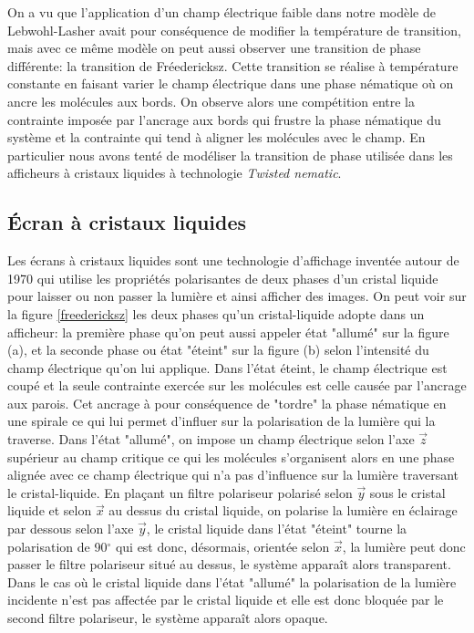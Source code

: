 \documentclass[11pt,a4paper]{article}
\numberwithin{equation}{section}
\begin{document}



On a vu que l'application d'un champ électrique faible dans notre modèle de Lebwohl-Lasher avait pour conséquence de modifier la température de transition, mais avec ce même modèle on peut aussi observer une transition de phase différente: la transition de Fréedericksz. Cette transition se réalise à température constante en faisant varier le champ électrique dans une phase nématique où on ancre les molécules aux bords. On observe alors une compétition entre la contrainte imposée par l'ancrage aux bords qui frustre la phase nématique du système et la contrainte qui tend à aligner les molécules avec le champ. 
 En particulier nous avons tenté de modéliser la transition de phase utilisée dans les afficheurs à cristaux liquides à technologie \textit{Twisted nematic}.
\subsection{Écran à cristaux liquides}

Les écrans à cristaux liquides sont une technologie d'affichage inventée autour de 1970 qui utilise les propriétés polarisantes de deux phases d'un cristal liquide pour laisser ou non passer la lumière et ainsi afficher des images. On peut voir sur la figure \ref{freedericksz} les deux phases qu'un cristal-liquide adopte dans un afficheur: la première phase qu'on peut aussi appeler état "allumé" sur la figure (a), et la seconde phase ou état "éteint" sur la figure (b) selon l'intensité du champ électrique qu'on lui applique. Dans l'état éteint, le champ électrique est coupé et la seule contrainte exercée sur les molécules est celle causée par l'ancrage aux parois. Cet ancrage à pour conséquence de "tordre" la phase nématique en une spirale ce qui lui permet d'influer sur la polarisation de la lumière qui la traverse. Dans l'état "allumé", on impose un champ électrique selon l'axe $\vec{z}$ supérieur au champ critique ce qui les molécules s'organisent alors en une phase alignée avec ce champ électrique qui n'a pas d'influence sur la lumière traversant le cristal-liquide. En plaçant un filtre polariseur polarisé selon $\vec{y}$ sous le cristal liquide et selon $\vec{x}$ au dessus du cristal liquide, on polarise la lumière en éclairage par dessous selon l'axe $\vec{y}$, le cristal liquide dans l'état "éteint" tourne la polarisation de 90$^\circ$ qui est donc, désormais, orientée selon $\vec{x}$, la lumière peut donc passer le filtre polariseur situé au dessus, le système apparaît alors transparent. Dans le cas où le cristal liquide dans l'état "allumé" la polarisation de la lumière incidente n'est pas affectée par le cristal liquide et elle est donc bloquée par le second filtre polariseur, le système apparaît alors opaque.
\end{document}
